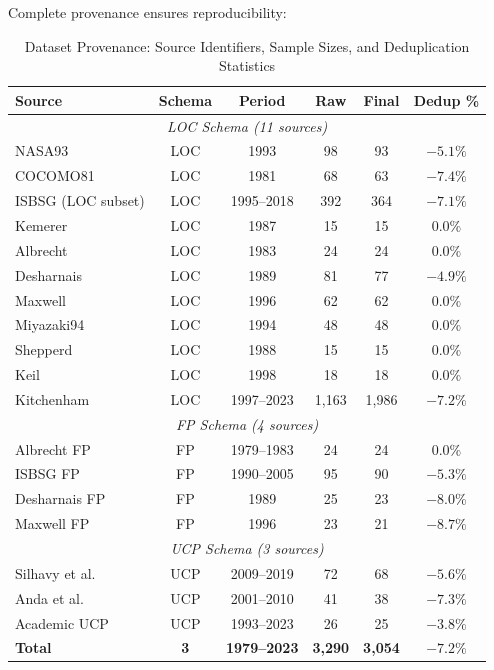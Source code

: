 \documentclass[11pt,a4paper]{article}
\begin{document}
Complete provenance ensures reproducibility:

\begin{table}[h]
\centering
\caption{Dataset Provenance: Source Identifiers, Sample Sizes, and Deduplication Statistics}
\label{tab:dataset-manifest}
\footnotesize
\begin{tabular}{|l|c|c|c|c|c|}
\hline
\textbf{Source} & \textbf{Schema} & \textbf{Period} & \textbf{Raw} & \textbf{Final} & \textbf{Dedup \%} \\
\hline
\multicolumn{6}{|c|}{\textit{LOC Schema (11 sources)}} \\
\hline
NASA93 & LOC & 1993 & 98 & 93 & $-5.1\%$ \\
COCOMO81 & LOC & 1981 & 68 & 63 & $-7.4\%$ \\
ISBSG (LOC subset) & LOC & 1995--2018 & 392 & 364 & $-7.1\%$ \\
Kemerer & LOC & 1987 & 15 & 15 & $0.0\%$ \\
Albrecht & LOC & 1983 & 24 & 24 & $0.0\%$ \\
Desharnais & LOC & 1989 & 81 & 77 & $-4.9\%$ \\
Maxwell & LOC & 1996 & 62 & 62 & $0.0\%$ \\
Miyazaki94 & LOC & 1994 & 48 & 48 & $0.0\%$ \\
Shepperd & LOC & 1988 & 15 & 15 & $0.0\%$ \\
Keil & LOC & 1998 & 18 & 18 & $0.0\%$ \\
Kitchenham & LOC & 1997--2023 & 1,163 & 1,986 & $-7.2\%$ \\
\hline
\multicolumn{6}{|c|}{\textit{FP Schema (4 sources)}} \\
\hline
Albrecht FP & FP & 1979--1983 & 24 & 24 & $0.0\%$ \\
ISBSG FP & FP & 1990--2005 & 95 & 90 & $-5.3\%$ \\
Desharnais FP & FP & 1989 & 25 & 23 & $-8.0\%$ \\
Maxwell FP & FP & 1996 & 23 & 21 & $-8.7\%$ \\
\hline
\multicolumn{6}{|c|}{\textit{UCP Schema (3 sources)}} \\
\hline
Silhavy et al.\ & UCP & 2009--2019 & 72 & 68 & $-5.6\%$ \\
Anda et al.\ & UCP & 2001--2010 & 41 & 38 & $-7.3\%$ \\
Academic UCP & UCP & 1993--2023 & 26 & 25 & $-3.8\%$ \\
\hline
\textbf{Total} & \textbf{3} & \textbf{1979--2023} & \textbf{3,290} & \textbf{3,054} & \textbf{$-7.2\%$} \\
\hline
\end{tabular}
\end{table}
\end{document}

